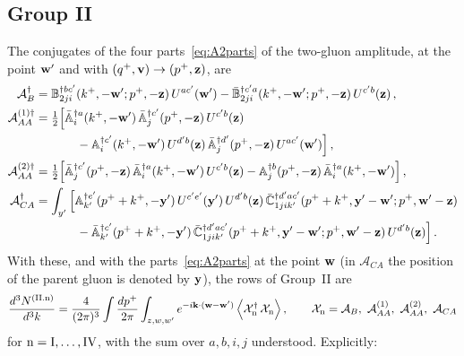 \subsection{Group II}

The conjugates of the four parts~\eqref{eq:A2parts} of the two-gluon amplitude, at the point $\mathbf{w}'$ and with $(q^+,\mathbf{v})\to(p^+,\mathbf{z})$, are
\begin{align}\label{eq:A2partsdag}
\mathcal A_B^\dagger&=\mathbb{B}^{\dagger bc'}_{2ji}(k^+,-\mathbf{w}';p^+,-\mathbf{z})\,U^{ac'}(\mathbf{w}')-\bar{\mathbb{B}}^{\dagger c'a}_{2ji}(k^+,-\mathbf{w}';p^+,-\mathbf{z})\,U^{c'b}(\mathbf{z})\,,\notag\\
\mathcal A^{(1)\dagger}_{AA}&=\tfrac12\Big[\bar{\mathbb{A}}^{\dagger a}_i(k^+,-\mathbf{w}')\,\bar{\mathbb{A}}^{\dagger c'}_j(p^+,-\mathbf{z})\,U^{c'b}(\mathbf{z})\notag\\&\hspace{1.2cm}-\mathbb{A}^{\dagger c'}_i(k^+,-\mathbf{w}')\,U^{d'b}(\mathbf{z})\,\bar{\mathbb{A}}^{\dagger d'}_j(p^+,-\mathbf{z})\,U^{ac'}(\mathbf{w}')\Big]\,,\notag\\
\mathcal A^{(2)\dagger}_{AA}&=\tfrac12\Big[\bar{\mathbb{A}}^{\dagger c'}_j(p^+,-\mathbf{z})\,\bar{\mathbb{A}}^{\dagger a}_i(k^+,-\mathbf{w}')\,U^{c'b}(\mathbf{z})-\mathbb{A}^{\dagger b}_j(p^+,-\mathbf{z})\,\bar{\mathbb{A}}^{\dagger a}_i(k^+,-\mathbf{w}')\Big]\,,\notag\\
\mathcal A_{CA}^\dagger&=\int_{y'}\Big[\mathbb{A}^{\dagger e'}_{k'}(p^++k^+,-\mathbf{y}')\,U^{c'e'}(\mathbf{y}')\,U^{d'b}(\mathbf{z})\,\bar{\mathbb{C}}^{\dagger d'ac'}_{1jik'}(p^++k^+,\mathbf{y}'-\mathbf{w}';p^+,\mathbf{w}'-\mathbf{z})\notag\\
&\hspace{1.2cm}-\bar{\mathbb{A}}^{\dagger c'}_{k'}(p^++k^+,-\mathbf{y}')\,\bar{\mathbb{C}}^{\dagger d'ac'}_{1jik'}(p^++k^+,\mathbf{y}'-\mathbf{w}';p^+,\mathbf{w}'-\mathbf{z})\,U^{d'b}(\mathbf{z})\Big]\,.
\end{align}
With these, and with the parts~\eqref{eq:A2parts} at the point $\mathbf{w}$ (in $\mathcal A_{CA}$ the position of the parent gluon is denoted by $\mathbf{y}$), the rows of Group~II are
\begin{align}\label{eq:GroupIIrows}
\frac{d^3N^{\rm(II.n)}}{d^3k}=\frac{4}{(2\pi)^3}\int\frac{dp^+}{2\pi}\int_{z,w,w'}e^{-i\mathbf{k}\cdot(\mathbf{w}-\mathbf{w}')}\,\Big\langle\mathcal X^{\dagger}_{\rm n}\,\mathcal X_{\rm n}\Big\rangle\,,\qquad
\mathcal X_{\rm n}=\mathcal A_B,\ \mathcal A^{(1)}_{AA},\ \mathcal A^{(2)}_{AA},\ \mathcal A_{CA}
\end{align}
for ${\rm n}={\rm I},\dots,{\rm IV}$, with the sum over $a,b,i,j$ understood. Explicitly:
